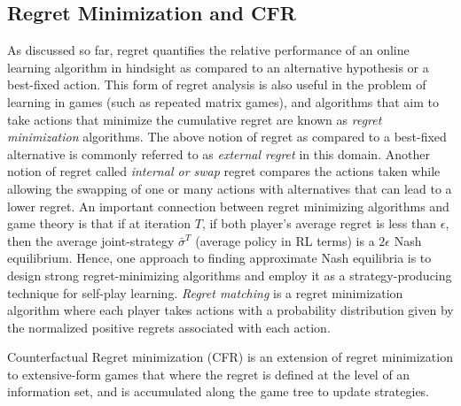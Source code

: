\subsection{Regret Minimization and CFR}
As discussed so far, regret quantifies the relative performance of an online learning algorithm in
hindsight as compared to an alternative hypothesis or a best-fixed action.
This form of regret analysis is also useful in the problem of learning in games (such as repeated
matrix games), and algorithms that aim to take actions that minimize the cumulative regret are
known as \textit{regret minimization} algorithms.
The above notion of regret as compared to a best-fixed alternative is commonly referred to as
\textit{external regret} in this domain.
Another notion of regret called \textit{internal or swap} regret compares the actions taken while
allowing the swapping of one or many actions with alternatives that can lead to a lower regret.
An important connection between regret minimizing algorithms and game theory is that if at
iteration $T$, if both player's average regret is less than $\epsilon$, then the average
joint-strategy $\bar{\sigma}^T$ (average policy in RL terms) is a $2\epsilon$ Nash equilibrium.
Hence, one approach to finding approximate Nash equilibria is to design strong regret-minimizing
algorithms and employ it as a strategy-producing technique for self-play learning.
\textit{Regret matching} is a regret minimization algorithm where each player takes actions with a probability
distribution given by the normalized positive regrets associated with each action.

Counterfactual Regret minimization (CFR) is an extension of regret minimization to extensive-form
games that where the regret is defined at the level of an information set, and is accumulated along
the game tree to update strategies.
